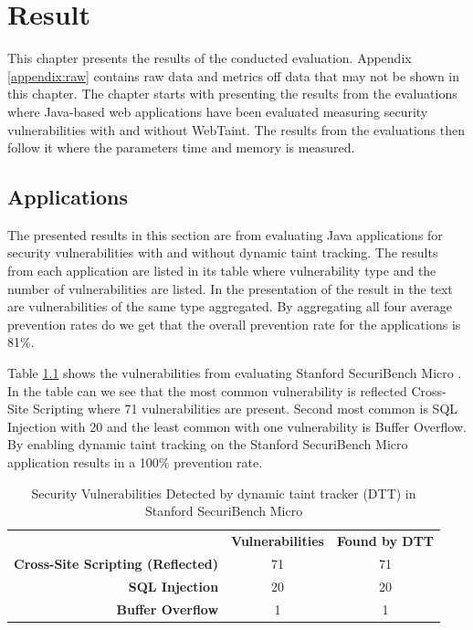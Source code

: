 \chapter{Result}
\label{Result}
This chapter presents the results of the conducted evaluation. Appendix \ref{appendix:raw} contains raw data and metrics off data that may not be shown in this chapter. The chapter starts with presenting the results from the \textit{} evaluations where Java-based web applications have been evaluated measuring security vulnerabilities with and without WebTaint. The results from the \textit{} evaluations then follow it where the parameters time and memory is measured. 



\section{Applications}
\label{Applications}
The presented results in this section are from evaluating Java applications for security vulnerabilities with and without dynamic taint tracking. The results from each application are listed in its table where vulnerability type and the number of vulnerabilities are listed. In the presentation of the result in the text are vulnerabilities of the same type aggregated. By aggregating all four average prevention rates do we get that the overall prevention rate for the applications is 81\%.

Table \ref{table:MicroTable} shows the vulnerabilities from evaluating Stanford SecuriBench Micro \parencite{securiBenchMicro}. In the table can we see that the most common vulnerability is reflected Cross-Site Scripting where 71 vulnerabilities are present. Second most common is SQL Injection with 20 and the least common with one vulnerability is Buffer Overflow. By enabling dynamic taint tracking on the Stanford SecuriBench Micro \parencite{securiBenchMicro} application results in a 100\% prevention rate.

\begin{table}[H]
  \centering
  \caption{Security Vulnerabilities Detected by dynamic taint tracker (DTT) in Stanford SecuriBench Micro}
  \label{table:MicroTable}
    \begin{tabular}{rcc}
      & \textbf{Vulnerabilities} & \textbf{Found by DTT} \\
      \textbf{Cross-Site Scripting (Reflected)} & 71            & 71  \\
      \textbf{SQL Injection}                    & 20            & 20  \\
      \textbf{Buffer Overflow}                  & 1             & 1  
    \end{tabular}
\end{table}

